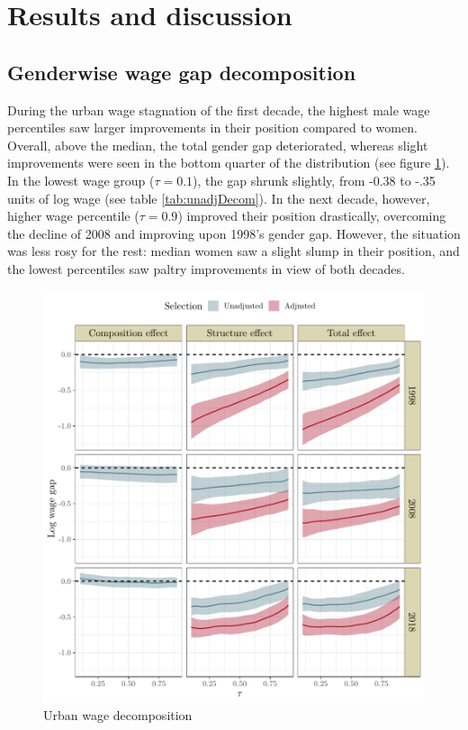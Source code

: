 \section{Results and discussion} \label{isect4}

\subsection{Genderwise wage gap decomposition}

During the urban wage stagnation of the first decade, the highest male wage percentiles saw larger improvements in their position compared to women. Overall, above the median, the total gender gap deteriorated, whereas slight improvements were seen in the bottom quarter of the distribution (see figure \ref{fig:decomMainResultUrb}). In the lowest wage group ($\tau = 0.1$), the gap shrunk slightly, from -0.38 to -.35 units of log wage (see table \ref{tab:unadjDecom}). In the next decade, however, higher wage percentile ($\tau = 0.9$) improved their position drastically, overcoming the decline of 2008 and improving upon 1998's gender gap. However, the situation was less rosy for the rest: median women saw a slight slump in their position, and the lowest percentiles saw paltry improvements in view of both decades.\par 

\begin{figure}[bth] 
	\centering
	\includegraphics[width=.8\textwidth]{./figure/UrbanDecom_all_all}
	\caption{Urban wage decomposition}
	\label{fig:decomMainResultUrb}
\end{figure} 

